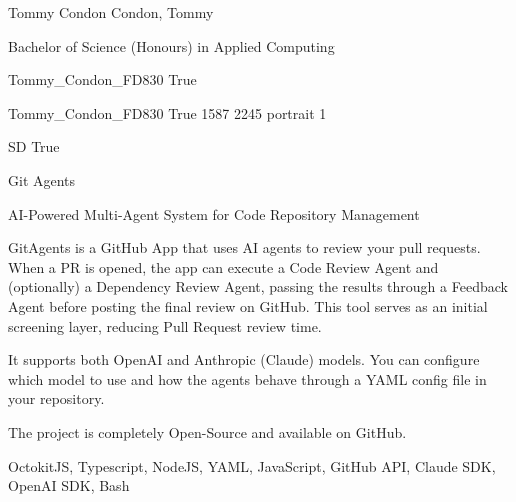 
\begingroup{}\relax



\def\Key{Tommy_Condon_FD830}

{Tommy Condon}
{Condon, Tommy}

{Bachelor of Science (Honours) in Applied Computing}

{Tommy_Condon_FD830}
{True}

{Tommy_Condon_FD830}
{True}
{1587}
{2245}
{portrait}
{1}

{SD}
{True}

{Git Agents}

{AI-Powered Multi-Agent System for Code Repository Management}

{GitAgents is a GitHub App that uses AI agents to review your pull requests. When a PR is opened, the app can execute a Code Review Agent and (optionally) a Dependency Review Agent, passing the results through a Feedback Agent before posting the final review on GitHub. This tool serves as an initial screening layer, reducing Pull Request review time.

It supports both OpenAI and Anthropic (Claude) models. You can configure which model to use and how the agents behave through a YAML config file in your repository.

The project is completely Open-Source and available on GitHub.}

{OctokitJS, Typescript, NodeJS, YAML, JavaScript, GitHub API, Claude SDK, OpenAI SDK, Bash}

